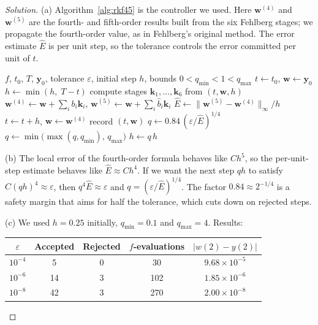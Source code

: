 \documentclass[11pt]{article}
\theoremstyle{definition}
\newenvironment{solution}{\begin{proof}[Solution]}{\end{proof}}
\begin{document}
\begin{solution}
(a) Algorithm~\ref{alg:rkf45} is the controller we used. Here $\mathbf{w}^{(4)}$ and $\mathbf{w}^{(5)}$ are the fourth- and fifth-order results built from the six Fehlberg stages; we propagate the fourth-order value, as in Fehlberg's original method. The error estimate $\hat{E}$ is per unit step, so the tolerance controls the error committed per unit of $t$.

\begin{algorithm}[ht]
  \caption{Adaptive RKF45 integration}
  \label{alg:rkf45}
  \begin{algorithmic}[1]
    \Require $f$, $t_0$, $T$, $\mathbf{y}_0$, tolerance $\varepsilon$, initial step $h$, bounds $0 < q_{\min} < 1 < q_{\max}$
    \State $t \gets t_0$, \quad $\mathbf{w} \gets \mathbf{y}_0$
      \State $h \gets \min(h,\; T - t)$ 
      \State compute stages $\mathbf{k}_1,\dots,\mathbf{k}_6$ from $(t, \mathbf{w}, h)$
      \State $\mathbf{w}^{(4)} \gets \mathbf{w} + \sum_{i} b_i \mathbf{k}_i$, \quad $\mathbf{w}^{(5)} \gets \mathbf{w} + \sum_i \hat{b}_i \mathbf{k}_i$
      \State $\hat{E} \gets \lVert \mathbf{w}^{(5)} - \mathbf{w}^{(4)} \rVert_\infty / h$
        \State $t \gets t + h$, \quad $\mathbf{w} \gets \mathbf{w}^{(4)}$ 
        \State record $(t, \mathbf{w})$
      \EndIf
      \State $q \gets 0.84\,(\varepsilon/\hat{E})^{1/4}$
      \State $q \gets \min\bigl(\max(q, q_{\min}),\, q_{\max}\bigr)$ 
      \State $h \gets q\,h$ 
    \EndWhile
  \end{algorithmic}
\end{algorithm}

(b) The local error of the fourth-order formula behaves like $C h^5$, so the per-unit-step estimate behaves like $\hat{E} \approx C h^4$. If we want the next step $qh$ to satisfy $C (qh)^4 \approx \varepsilon$, then $q^4 \hat{E} \approx \varepsilon$ and $q = (\varepsilon/\hat{E})^{1/4}$. The factor $0.84 \approx 2^{-1/4}$ is a safety margin that aims for half the tolerance, which cuts down on rejected steps.

(c) We used $h = 0.25$ initially, $q_{\min} = 0.1$ and $q_{\max} = 4$. Results:

\begin{center}
  \begin{tabular}{@{}ccccc@{}}
    \toprule
    $\varepsilon$ & Accepted & Rejected & $f$-evaluations & $|w(2) - y(2)|$ \\
    \midrule
    $10^{-4}$ & 5  & 0 & 30  & $9.68\times10^{-5}$ \\
    $10^{-6}$ & 14 & 3 & 102 & $1.85\times10^{-6}$ \\
    $10^{-8}$ & 42 & 3 & 270 & $2.00\times10^{-8}$ \\
    \bottomrule
  \end{tabular}
\end{center}


\end{solution}
\end{document}
